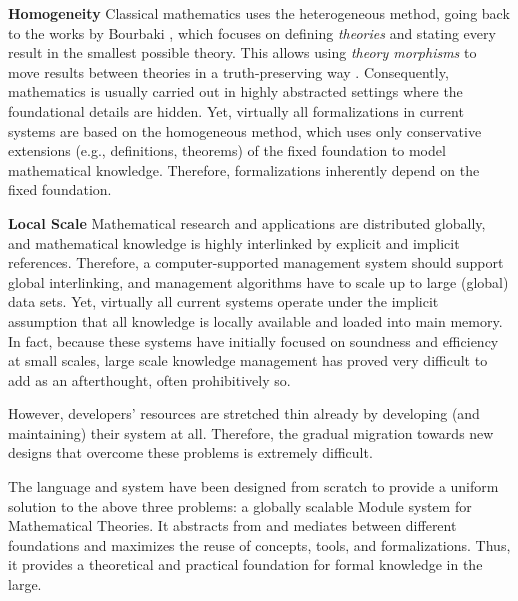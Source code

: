 {\bf Homogeneity}
Classical mathematics uses the heterogeneous method, going back to the works by Bourbaki \cite{bourbakiunivers}, which focuses on defining \emph{theories} and stating every result in the smallest possible theory.
This allows using \emph{theory morphisms} to move results between theories in a truth-preserving way \cite{littletheories}.
Consequently, mathematics is usually carried out in highly abstracted settings where the foundational details are hidden.
Yet, virtually all formalizations in current systems are based on the homogeneous method, which uses only conservative extensions (e.g., definitions, theorems) of the fixed foundation to model mathematical knowledge.
Therefore, formalizations inherently depend on the fixed foundation.

{\bf Local Scale} Mathematical research and applications are distributed globally, and mathematical knowledge is highly interlinked by explicit and implicit references.
Therefore, a computer-supported management system should support global interlinking, and management algorithms have to scale up to large (global) data sets.
Yet, virtually all current systems operate under the implicit assumption that all knowledge is locally available and loaded into main memory.
In fact, because these systems have initially focused on soundness and efficiency at small scales, large scale knowledge management has proved very difficult to add as an afterthought, often prohibitively so.
\medskip

However, developers' resources are stretched thin already by developing (and maintaining) their system at all.
Therefore, the gradual migration towards new designs that overcome these problems is extremely difficult.

The {\mmt} language and system have been designed from scratch to provide a uniform solution to the above three problems: a globally scalable Module system for Mathematical Theories.
It abstracts from and mediates between different foundations and maximizes the reuse of concepts, tools, and formalizations.
Thus, it provides a theoretical and practical foundation for formal knowledge in the large.

